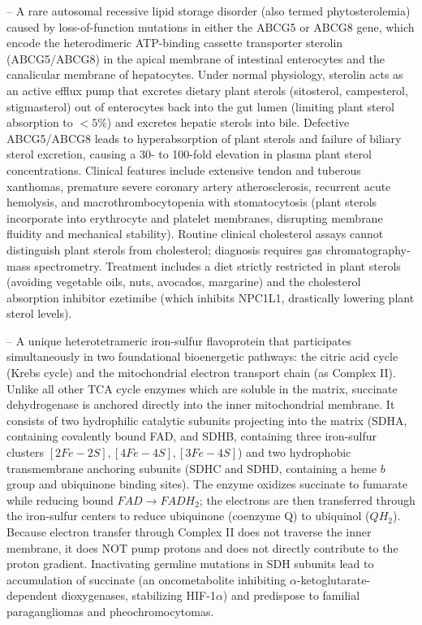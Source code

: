 -- A rare autosomal recessive lipid storage disorder (also termed phytosterolemia) caused by loss-of-function mutations in either the ABCG5 or ABCG8 gene, which encode the heterodimeric ATP-binding cassette transporter sterolin (ABCG5/ABCG8) in the apical membrane of intestinal enterocytes and the canalicular membrane of hepatocytes. Under normal physiology, sterolin acts as an active efflux pump that excretes dietary plant sterols (sitosterol, campesterol, stigmasterol) out of enterocytes back into the gut lumen (limiting plant sterol absorption to $<5\%$) and excretes hepatic sterols into bile. Defective ABCG5/ABCG8 leads to hyperabsorption of plant sterols and failure of biliary sterol excretion, causing a 30- to 100-fold elevation in plasma plant sterol concentrations. Clinical features include extensive tendon and tuberous xanthomas, premature severe coronary artery atherosclerosis, recurrent acute hemolysis, and macrothrombocytopenia with stomatocytosis (plant sterols incorporate into erythrocyte and platelet membranes, disrupting membrane fluidity and mechanical stability). Routine clinical cholesterol assays cannot distinguish plant sterols from cholesterol; diagnosis requires gas chromatography-mass spectrometry. Treatment includes a diet strictly restricted in plant sterols (avoiding vegetable oils, nuts, avocados, margarine) and the cholesterol absorption inhibitor ezetimibe (which inhibits NPC1L1, drastically lowering plant sterol levels).

-- A unique heterotetrameric iron-sulfur flavoprotein that participates simultaneously in two foundational bioenergetic pathways: the citric acid cycle (Krebs cycle) and the mitochondrial electron transport chain (as Complex II). Unlike all other TCA cycle enzymes which are soluble in the matrix, succinate dehydrogenase is anchored directly into the inner mitochondrial membrane. It consists of two hydrophilic catalytic subunits projecting into the matrix (SDHA, containing covalently bound FAD, and SDHB, containing three iron-sulfur clusters $[2Fe-2S], [4Fe-4S], [3Fe-4S]$) and two hydrophobic transmembrane anchoring subunits (SDHC and SDHD, containing a heme $b$ group and ubiquinone binding sites). The enzyme oxidizes succinate to fumarate while reducing bound $FAD \to FADH_2$; the electrons are then transferred through the iron-sulfur centers to reduce ubiquinone (coenzyme Q) to ubiquinol ($QH_2$). Because electron transfer through Complex II does not traverse the inner membrane, it does NOT pump protons and does not directly contribute to the proton gradient. Inactivating germline mutations in SDH subunits lead to accumulation of succinate (an oncometabolite inhibiting $\alpha$-ketoglutarate-dependent dioxygenases, stabilizing HIF-1$\alpha$) and predispose to familial paragangliomas and pheochromocytomas.

